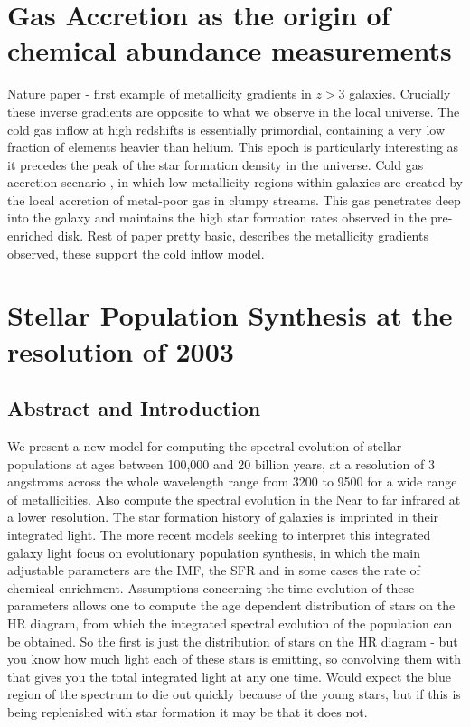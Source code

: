 \documentclass{literature}
\begin{document}
\section{Gas Accretion as the origin of chemical abundance measurements}\label{sec:Cresci_2010}
Nature paper - first example of metallicity gradients in $z > 3$ galaxies. Crucially these inverse gradients are opposite to what we observe in the local universe. The cold gas inflow at high redshifts is essentially primordial, containing a very low fraction of elements heavier than helium. This epoch is particularly interesting as it precedes the peak of the star formation density in the universe. Cold gas accretion scenario \citep{Keres_2005}, in which low metallicity regions within galaxies are created by the local accretion of metal-poor gas in clumpy streams. This gas penetrates deep into the galaxy and maintains the high star formation rates observed in the pre-enriched disk. Rest of paper pretty basic, describes the metallicity gradients observed, these support the cold inflow model.  


\section{Stellar Population Synthesis at the resolution of 2003}\label{sec:BC03}
\subsection{Abstract and Introduction} 
We present a new model for computing the spectral evolution of stellar populations at ages between 100,000 and 20 billion years, at a resolution of 3 angstroms across the whole wavelength range from 3200 to 9500 for a wide range of metallicities. Also compute the spectral evolution in the Near to far infrared at a lower resolution. The star formation history of galaxies is imprinted in their integrated light. The more recent models seeking to interpret this integrated galaxy light focus on evolutionary population synthesis, in which the main adjustable parameters are the IMF, the SFR and in some cases the rate of chemical enrichment. Assumptions concerning the time evolution of these parameters allows one to compute the age dependent distribution of stars on the HR diagram, from which the integrated spectral evolution of the population can be obtained. So the first is just the distribution of stars on the HR diagram - but you know how much light each of these stars is emitting, so convolving them with that gives you the total integrated light at any one time. Would expect the blue region of the spectrum to die out quickly because of the young stars, but if this is being replenished with star formation it may be that it does not. \\
\end{document}
